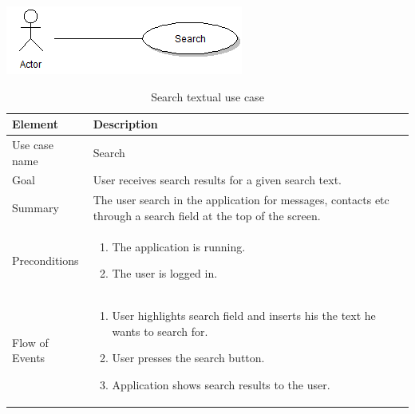 \begin{table}
\begin{center}
\begin{center}
\includegraphics[width=\textwidth]{search}
\end{center}
\begin{tabular}{p{3cm}|p{12cm}} \hline
\textbf{Element} & \textbf{Description} \\ \hline \hline
Use case name & Search \\
Goal & User receives search results for a given search text. \\
Summary & The user search in the application for messages, contacts etc through a search field at the top of the screen. \\
Preconditions &
\begin{enumerate}
\item{}The application is running.
\item{}The user is logged in.
\end{enumerate} \\ \hline
Flow of Events &
\begin{enumerate}
\item{}User highlights search field and inserts his the text he wants to search for.
\item{}User presses the search button.
\item{}Application shows search results to the user.
\end{enumerate}\\ \hline
\end{tabular}
\end{center}
\caption{Search textual use case} \label{tab:search}
\end{table}

